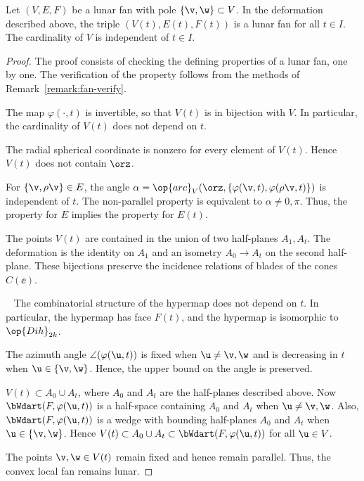 \begin{lemma}[]\label{lemma:lunar-deform} 
Let $(V,E,F)$ be a lunar fan with pole $\{\v,\w\}\subset V$.  In
the deformation described above, the triple $(V(t),E(t),F(t))$ is a
lunar fan for all $t\in I$.  The cardinality of $V$ is
independent of $t\in I$.
\end{lemma}

\begin{proof} The proof consists of checking the defining properties
  of a lunar fan, one by one.  The verification of the property
   follows from the methods of
  Remark~\ref{remark:fan-verify}.

The map $\varphi(\cdot,t)$ is invertible, so that $V(t)$ is in
bijection with $V$.  In particular, the cardinality of $V(t)$ does not depend
on $t$.

 The radial spherical coordinate is nonzero for every
element of $V(t)$.  Hence $V(t)$ does not contain $\orz$.

 For $\{\v,\rho \v\}\in E$, the angle
$\alpha=\op{arc}_V(\orz,\{\varphi(\v,t),\varphi(\rho \v,t)\})$ is
independent of $t$.  The non-parallel property is equivalent to
$\alpha\ne0,\pi$.  Thus, the  property for $E$ implies
the property for $E(t)$.

 The points $V(t)$ are contained in the union of
two half-planes $A_1,A_t$.  The deformation is the identity on $A_1$
and an isometry $A_0\to A_t$ on the second half-plane.  These
bijections preserve the incidence relations of blades of the cones
$C(\ee)$.

~ The combinatorial structure of
the hypermap does not depend on $t$.  In particular, the hypermap has
face $F(t)$, and the hypermap is isomorphic to $\op{Dih}_{2k}$.

 The azimuth angle $\angle(\varphi(\u,t))$ is fixed when
$\u\ne \v,\w$ and is decreasing in $t$ when $\u\in \{\v,\w\}$.
Hence, the upper bound on the angle is preserved.

 $V(t)\subset A_0\cup A_t$, where $A_0$ and $A_t$ are
the half-planes described above.  Now $\bWdart(F,\varphi(\u,t))$ is
a half-space containing $A_0$ and $A_t$ when $\u\ne \v,\w$.  Also,
$\bWdart(F,\varphi(\u,t))$ is a wedge with bounding half-planes
$A_0$ and $A_t$ when $\u\in \{\v,\w\}$.  Hence $V(t)\subset A_0\cup
A_t\subset \bWdart(F,\varphi(\u,t))$ for all $\u\in V$.

 The points $\v,\w\in V(t)$ remain fixed and hence
remain parallel.  Thus, the convex local fan remains lunar.
\end{proof}
%


